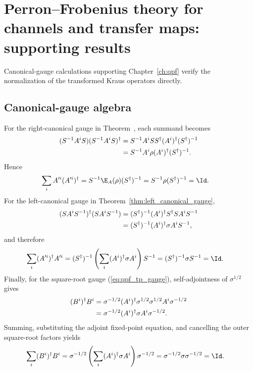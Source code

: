 \chapter{Perron--Frobenius theory for channels and transfer maps: supporting results}
\label{ch:qpf_supporting_results}

Canonical-gauge calculations supporting Chapter~\ref{ch:qpf} verify the
normalization of the transformed Kraus operators directly.

\section{Canonical-gauge algebra}
\label{sec:app_qpf_gauge}

For the right-canonical gauge in
Theorem~\cite[``Right-canonical (unital) gauge'']{QICLean2026Blueprint}, each summand becomes
\begin{align}
    (S^{-1}A^iS)(S^{-1}A^iS)^\dagger
     & =S^{-1}A^iSS^\dagger(A^i)^\dagger(S^\dagger)^{-1}
    \notag                                               \\
     & =S^{-1}A^i\rho(A^i)^\dagger(S^\dagger)^{-1}.
    \notag
\end{align}
Hence
\begin{align}
    \sum_iA'^i(A'^i)^\dagger
     & =S^{-1}\E_A(\rho)(S^\dagger)^{-1}
    =S^{-1}\rho(S^\dagger)^{-1}
    =\Id.
    \notag
\end{align}
For the left-canonical gauge in Theorem~\ref{thm:left_canonical_gauge},
\begin{align}
    (SA^iS^{-1})^\dagger(SA^iS^{-1})
     & =(S^\dagger)^{-1}(A^i)^\dagger S^\dagger SA^iS^{-1}
    \notag                                                 \\
     & =(S^\dagger)^{-1}(A^i)^\dagger\sigma A^iS^{-1},
    \notag
\end{align}
and therefore
\begin{align}
    \sum_i(A'^i)^\dagger A'^i
     & =(S^\dagger)^{-1}
    \left(\sum_i(A^i)^\dagger\sigma A^i\right)S^{-1}
    =(S^\dagger)^{-1}\sigma S^{-1}
    =\Id.
    \notag
\end{align}
Finally, for the square-root gauge
(\ref{eq:qpf_tp_gauge}), self-adjointness of $\sigma^{1/2}$ gives
\begin{align}
    (B^i)^\dagger B^i
     & =\sigma^{-1/2}(A^i)^\dagger
    \sigma^{1/2}\sigma^{1/2}A^i\sigma^{-1/2}
    \notag                                                 \\
     & =\sigma^{-1/2}(A^i)^\dagger\sigma A^i\sigma^{-1/2}.
    \notag
\end{align}
Summing, substituting the adjoint fixed-point equation, and cancelling the
outer square-root factors yields
\begin{align}
    \sum_i(B^i)^\dagger B^i
     & =\sigma^{-1/2}
    \left(\sum_i(A^i)^\dagger\sigma A^i\right)\sigma^{-1/2}
    =\sigma^{-1/2}\sigma\sigma^{-1/2}
    =\Id.
    \notag
\end{align}


